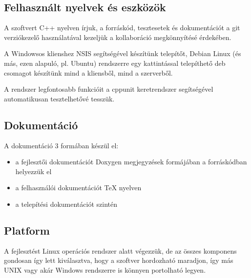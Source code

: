 \documentclass[a4paper,12pt]{article}
\begin{document}
\subsection{Felhasznált nyelvek és eszközök}

A szoftvert C++ nyelven írjuk, a forráskód, tesztesetek és dokumentációt a git
verziókezelő használatával kezeljük a kollaboráció megkönnyítésé érdekében.

A Windowsos klienshez NSIS segítségével készítünk telepítőt, Debian Linux
(és más, ezen alapuló, pl. Ubuntu) rendszerre egy kattintással telepíthető
deb csomagot készítünk mind a kliensből, mind a szerverből.

A rendszer legfontosabb funkcióit a cppunit keretrendszer segítségével
automatikusan tesztelhetővé tesszük.

\subsection{Dokumentáció}

A dokumentáció 3 formában készül el:
\begin{itemize}
\item a fejlesztői dokumentációt Doxygen megjegyzések formájában a forráskódban
helyezzük el
\item a felhasználói dokumentációt \TeX{} nyelven
\item a telepítési dokumentációt szintén
\end{itemize}

\subsection{Platform}

A fejlesztést Linux operációs rendszer alatt végezzük, de az összes komponens
gondosan így lett kiválasztva, hogy a szoftver hordozható maradjon, így más
UNIX vagy akár Windows rendszerre is könnyen portolható legyen.
\end{document}
